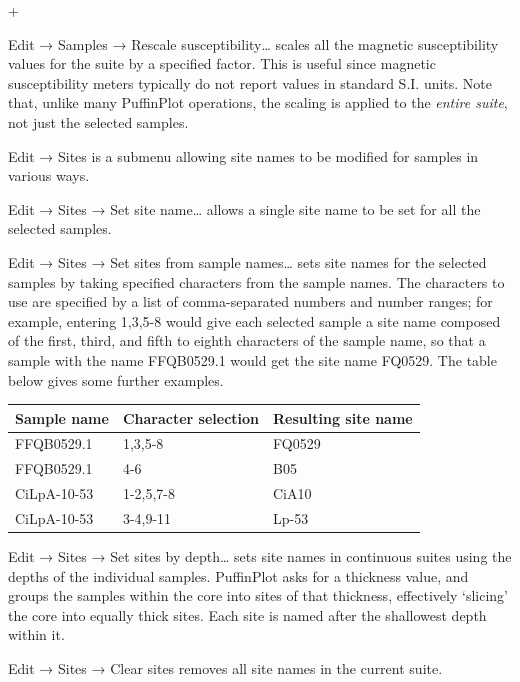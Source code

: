 \documentclass[a4paper,british]{article}
\newcommand{\menuitemlabel}[1]{%
\mbox{\textsf{#1}}\hfil}
\newenvironment{menuitemlist}%
{\begin{list}{}{%
\renewcommand{\makelabel}{\menuitemlabel}%
\setlength{\labelwidth}{35pt}%
\setlength{\leftmargin}%
             {\labelwidth+\labelsep}}}%
{\end{list}}
\newcommand{\ppcmd}[1]{\textsf{#1}} %
\newcommand{\submenu}{ \textrm{→} }
\begin{document}
\begin{menuitemlist}
\item[Edit\submenu Samples\submenu Rescale susceptibility\ldots] scales
  all the magnetic susceptibility values for the suite by a specified
  factor. This is useful since magnetic susceptibility meters typically
  do not report values in standard S.I. units. Note that, unlike many
  PuffinPlot operations, the scaling is applied to the {\em entire
    suite}, not just the selected samples.

\item[Edit\submenu Sites] is a submenu allowing site names to be
  modified for samples in various ways.

\item[Edit\submenu Sites\submenu Set site name\ldots] allows a single
  site name to be set for all the selected samples.

\item[Edit\submenu Sites\submenu Set sites from sample names\ldots] sets
  site names for the selected samples by taking specified characters from the
  sample names. The characters to use are specified by a list of
  comma-separated numbers and number ranges; for example, entering
  \ppcmd{1,3,5-8} would give each selected sample a site name composed of the
  first, third, and fifth to eighth characters of the sample name, so that
  a sample with the name \ppcmd{FFQB0529.1} would get the site name
  \ppcmd{FQ0529}. The table below gives some further examples.

\begin{tabular}{lll} \toprule
Sample name & Character selection & Resulting site name \\ \midrule
FFQB0529.1 & 1,3,5-8 & FQ0529 \\
FFQB0529.1 & 4-6 & B05 \\
CiLpA-10-53 & 1-2,5,7-8 & CiA10 \\
CiLpA-10-53 & 3-4,9-11 & Lp-53 \\
\bottomrule \end{tabular}

\item[Edit\submenu Sites\submenu Set sites by depth\ldots] sets site
  names in continuous suites using the depths of the individual samples.
  PuffinPlot asks for a thickness value, and groups the samples within the
  core into sites of that thickness, effectively `slicing' the core into
  equally thick sites. Each site is named after the shallowest depth within
  it.

\item[Edit\submenu Sites\submenu Clear sites] removes all site names
  in the current suite.


\end{menuitemlist}
\end{document}
